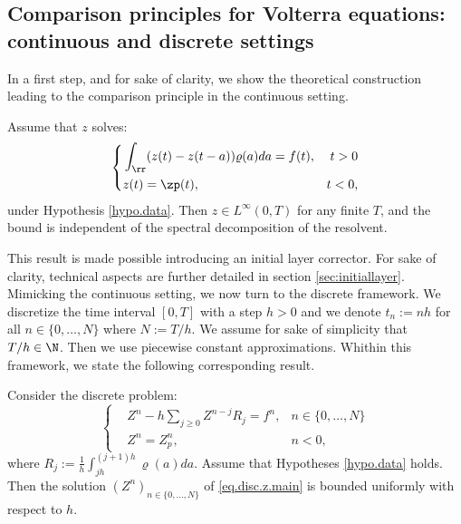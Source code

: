 \documentclass[]{jnsao}
\newcommand{\kernel}{\varrho}
\newcommand{\tkernel}{\tilde{\varrho}}
\renewcommand{\tr}{R}
\begin{document}
\subsection{Comparison principles for Volterra equations: continuous and discrete settings}
In a first step, and for sake of clarity, we show the 
theoretical construction leading to the comparison principle 
in the continuous setting.
\begin{theorem}\label{thm.main.comparison}
	Assume that $z$ solves:
	\begin{equation}\label{eq.z.main}
		\left\{\begin{aligned}
			&	 \int_\rr (z(t)-z(t- a)) \kernel(a) da = f(t), & t>0 \\
			&	z(t) = \zp(t), & t<0,
		\end{aligned}\right.
	\end{equation}
	under Hypothesis \ref{hypo.data}. Then $z \in L^\infty (0,T)$ for any finite $T$, and the bound is independent of the spectral decomposition of the resolvent.
\end{theorem}
This result is made possible introducing an initial layer corrector.
For sake of clarity,  technical aspects are further detailed in section \ref{sec:initiallayer}. %
\noindent Mimicking the continuous setting, we now turn to the discrete framework.
We discretize the time interval $[0,T]$ with a step $h>0$ and
 we denote $t_n:= n h$ for all $n \in \{0, \ldots, N\}$ where $N:= T/h$. 
 We assume for sake of simplicity that $T/h \in \N$.
 Then we use piecewise constant approximations. 
 Whithin this framework, we state the following corresponding result.
\begin{theorem}\label{thm.comp.disc.main}
	Consider the discrete problem:
	\begin{equation}\label{eq.disc.z.main}
	\left\{\begin{aligned}
		&	Z^n - h \sum_{j\geq 0} Z^{n-j} \tr_j = f^n , & n \in \{0, \ldots, N\} \\
		&	Z^n = Z_p^n , & n<0,
	\end{aligned}\right.
	\end{equation}
	where $R_j:= \frac{1}{h} \int_{jh}^{(j+1)h} \kernel(a) da$.
	Assume that %
	Hypotheses \ref{hypo.data} holds. Then the solution $(Z^n)_{n\in \{0,\dots,N\}}$ of \eqref{eq.disc.z.main} is bounded uniformly with respect to $h$.
\end{theorem}
\end{document}
